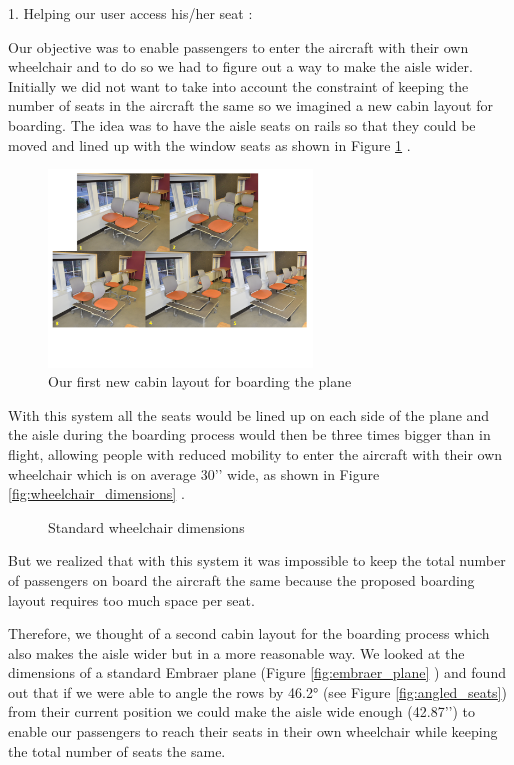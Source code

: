 1. Helping our user access his/her seat :

Our objective was to enable passengers to enter the aircraft with their own wheelchair and to do so we had to figure out a way to make the aisle wider. Initially we did not want to take into account the constraint of keeping the number of seats in the aircraft the same so we imagined a new cabin layout for boarding. The idea was to have the aisle seats on rails so that they could be moved and lined up with the window seats as shown in Figure \ref{fig:first_new_cabin_layout} . 

\begin{figure}[h]
  \centering
     \includegraphics[width=7cm]{images/first_new_cabin_layout.png}
   \caption{Our first new cabin layout for boarding the plane}
  \label{fig:first_new_cabin_layout}
\end{figure} 

With this system all the seats would be lined up on each side of the plane and the aisle during the boarding process would then be three times bigger than in flight, allowing people with reduced mobility to enter the aircraft with their own wheelchair which is on average 30’’ wide, as shown in Figure \ref{fig:wheelchair_dimensions} .

\begin{figure}[h]
  \centering
   \caption{Standard wheelchair dimensions}
  \label{fig:wheelchair dimensions}
\end{figure}

But we realized that with this system it was impossible to keep the total number of passengers on board the aircraft the same because the proposed boarding layout requires too much space per seat. 

Therefore, we thought of a second cabin layout for the boarding process which also makes the aisle wider but in a more reasonable way. We looked at the dimensions of a standard Embraer plane (Figure \ref{fig:embraer_plane} ) and found out that if we were able to angle the rows by 46.2° (see Figure \ref{fig:angled_seats}) from their current position we could make the aisle wide enough (42.87’’) to enable our passengers to reach their seats in their own wheelchair while keeping the total number of seats the same.


